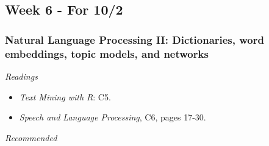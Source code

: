 \documentclass[
  10pt,
]{article}
\providecommand{\tightlist}{%
  \setlength{\itemsep}{0pt}\setlength{\parskip}{0pt}}
\begin{document}
\hypertarget{week-6---for-102}{%
\subsection{Week 6 - For 10/2}\label{week-6---for-102}}

\hypertarget{natural-language-processing-ii-dictionaries-word-embeddings-topic-models-and-networks}{%
\subsubsection{Natural Language Processing II: Dictionaries, word
embeddings, topic models, and
networks}\label{natural-language-processing-ii-dictionaries-word-embeddings-topic-models-and-networks}}

\emph{Readings}

\begin{itemize}
\tightlist
\item
  \emph{Text Mining with R}: C5.
\item
  \emph{Speech and Language Processing}, C6, pages 17-30.
\end{itemize}

\emph{Recommended}
\end{document}
